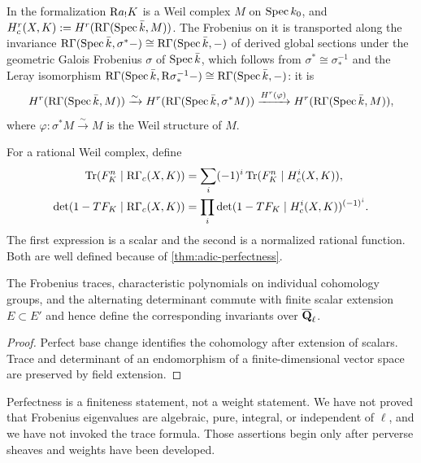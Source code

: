 \begin{formalization}
In the formalization \(\mathrm R a_!K\) is a Weil complex \(M\) on \(\operatorname{Spec} k_0\), and
\(H_c^r(X,K):=H^r(\mathrm R\Gamma(\operatorname{Spec}\bar k,M))\).  The Frobenius on it is transported along
the invariance \(\mathrm R\Gamma(\operatorname{Spec}\bar k,\sigma^*-)\cong\mathrm R\Gamma(\operatorname{Spec}\bar k,-)\) of derived
global sections under the geometric Galois Frobenius \(\sigma\) of \(\operatorname{Spec}\bar k\), which
follows from \(\sigma^*\cong\sigma^{-1}_*\) and the Leray isomorphism
\(\mathrm R\Gamma(\operatorname{Spec}\bar k,\mathrm R\sigma^{-1}_*-)\cong\mathrm R\Gamma(\operatorname{Spec}\bar k,-)\): it is
\[
 H^r(\mathrm R\Gamma(\operatorname{Spec}\bar k,M))
   \xrightarrow{\sim}
 H^r(\mathrm R\Gamma(\operatorname{Spec}\bar k,\sigma^*M))
   \xrightarrow{H^r(\varphi)}
 H^r(\mathrm R\Gamma(\operatorname{Spec}\bar k,M)),
\]
where \(\varphi:\sigma^*M\xrightarrow{\sim}M\) is the Weil structure of \(M\).
\end{formalization}

\begin{definition}
For a rational Weil complex, define
\begin{align*}
 \operatorname{Tr}(F_K^n\mid\mathrm R\Gamma_c(X,K))
   &=\sum_i(-1)^i
     \operatorname{Tr}(F_K^n\mid H_c^i(X,K)),\\
 \det(1-TF_K\mid\mathrm R\Gamma_c(X,K))
   &=\prod_i
     \det(1-TF_K\mid H_c^i(X,K))^{(-1)^i}.
\end{align*}
The first expression is a scalar and the second is a normalized rational
function.  Both are well defined because of
\cref{thm:adic-perfectness}.
\end{definition}

\begin{corollary}
\label{cor:weil-trace-coefficient-change}
The Frobenius traces, characteristic polynomials on individual cohomology
groups, and the alternating determinant commute with finite scalar extension
\(E\subset E'\) and hence define the corresponding invariants over
\(\overline{\mathbf Q}_\ell\).
\end{corollary}

\begin{proof}
Perfect base change identifies the cohomology after extension of scalars.
Trace and determinant of an endomorphism of a finite-dimensional vector
space are preserved by field extension.
\end{proof}

\begin{auditbox}
Perfectness is a finiteness statement, not a weight statement.  We have not
proved that Frobenius eigenvalues are algebraic, pure, integral, or
independent of \(\ell\), and we have not invoked the trace formula.  Those
assertions begin only after perverse sheaves and weights have been developed.
\end{auditbox}

